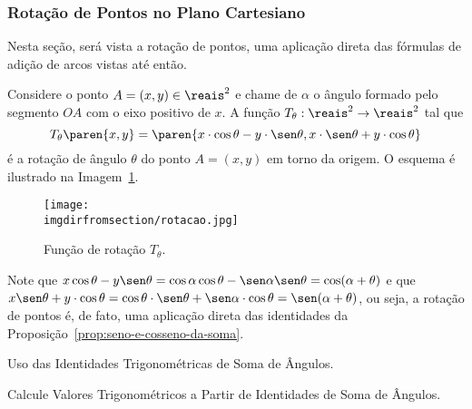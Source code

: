 \subsubsection{Rotação de Pontos no Plano Cartesiano}

Nesta seção, será vista a rotação de pontos, uma aplicação direta das fórmulas de adição de arcos vistas até então.

\begin{definition}
Considere o ponto $A = (x, y) \in \reais^2$ e chame de $\alpha$ o ângulo
formado pelo segmento $OA$ com o eixo positivo de $x$. A função
$T_{\theta} : \reais^2 \to \reais^2$  tal que
$$T_{\theta}\paren{x, y} = \paren{x\cdot \cos \theta - y\cdot \sen \theta, x\cdot \sen \theta + y\cdot \cos
\theta}$$ é a rotação de ângulo $\theta$ do ponto $A = (x,y)$ em
torno da origem. O esquema é ilustrado na Imagem~\ref{img:funcao-rotacao}.
%
\begin{figure}[H]
\centering
\texttt{[image: \\imgdirfromsection/rotacao.jpg]}
\caption{Função de rotação $T_{\theta}$.}
\label{img:funcao-rotacao}
\end{figure}
\end{definition}

\begin{remark}
    Note que $x\cos \theta - y\sen\theta = \cos\alpha\cos\theta - \sen\alpha\sen\theta = \cos(\alpha+\theta)$ e que 
    $x \sen \theta + y\cdot \cos \theta = \cos\theta \cdot \sen\theta + \sen\alpha \cdot \cos\theta = \sen(\alpha+\theta)$, 
    ou seja, a rotação de pontos é, de fato, uma aplicação direta das identidades da Proposição~\ref{prop:seno-e-cosseno-da-soma}.
\end{remark}

\begin{onlineact}
    {Uso das Identidades Trigonométricas de Soma de Ângulos}.
\end{onlineact}

\begin{onlineact}
    {Calcule Valores Trigonométricos a Partir de Identidades de Soma de Ângulos}.
\end{onlineact}